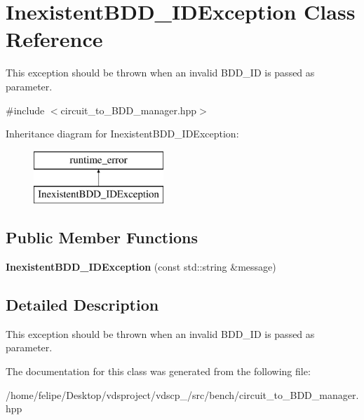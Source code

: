 \section{Inexistent\+B\+D\+D\+\_\+\+I\+D\+Exception Class Reference}
\label{classInexistentBDD__IDException}


This exception should be thrown when an invalid B\+D\+D\+\_\+\+ID is passed as parameter.  




{\ttfamily \#include $<$circuit\+\_\+to\+\_\+\+B\+D\+D\+\_\+manager.\+hpp$>$}

Inheritance diagram for Inexistent\+B\+D\+D\+\_\+\+I\+D\+Exception\+:\begin{figure}[H]
\begin{center}
\leavevmode
\includegraphics[height=2.000000cm]{classInexistentBDD__IDException}
\end{center}
\end{figure}
\subsection*{Public Member Functions}
\begin{DoxyCompactItemize}
\item 
{\bfseries Inexistent\+B\+D\+D\+\_\+\+I\+D\+Exception} (const std\+::string \&message)\label{classInexistentBDD__IDException_a574d927fc98d356d1ff18cef3d32ffb5}

\end{DoxyCompactItemize}


\subsection{Detailed Description}
This exception should be thrown when an invalid B\+D\+D\+\_\+\+ID is passed as parameter. 

The documentation for this class was generated from the following file\+:\begin{DoxyCompactItemize}
\item 
/home/felipe/\+Desktop/vdsproject/vdscp\+\_/src/bench/circuit\+\_\+to\+\_\+\+B\+D\+D\+\_\+manager.\+hpp\end{DoxyCompactItemize}
